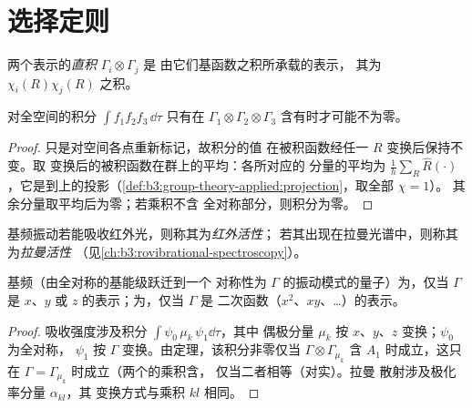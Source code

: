 \section{选择定则}

\begin{definition}[直积]\label{def:b3:group-theory-applied:direct-product}
两个表示的\emph{直积} $\Gamma_i\otimes\Gamma_j$ 是
由它们基函数之积所承载的表示，
其为 $\chi_i(R)\chi_j(R)$ 之积。
\end{definition}

\begin{theorem}[积分为零]\label{thm:b3:group-theory-applied:vanishing-integral}
对全空间的积分 $\int f_1f_2f_3\,\dd\tau$ 只有在
 $\Gamma_1\otimes\Gamma_2\otimes\Gamma_3$ 含有时才可能不为零。
\end{theorem}

\begin{proof}
只是对空间各点重新标记，故积分的值
在被积函数经任一 $R$ 变换后保持不变。取
变换后的被积函数在群上的平均：各所对应的
分量的平均为
$\frac1h\sum_R\hat R(\cdot)$，它是到上的投影（\cref{def:b3:group-theory-applied:projection}，取全部 $\chi = 1$）。
其余分量取平均后为零；若乘积不含
全对称部分，则积分为零。
\end{proof}

\begin{definition}\label{def:b3:group-theory-applied:activity}
基频振动若能吸收红外光，则称其为\emph{红外活性}；
若其出现在拉曼光谱中，则称其为\emph{拉曼活性}
（见\cref{ch:b3:rovibrational-spectroscopy}）。
\end{definition}

\begin{corollary}[红外与拉曼选择定则]\label{cor:b3:group-theory-applied:ir-raman}
基频（由全对称的基能级跃迁到一个
对称性为 $\Gamma$ 的振动模式的量子）为，仅当 $\Gamma$ 是
$x$、$y$ 或 $z$ 的表示；为，仅当 $\Gamma$ 是
二次函数（$x^2$、$xy$、\dots）的表示。
\end{corollary}

\begin{proof}
吸收强度涉及积分 $\int\psi_0\,\mu_k\,\psi_1\dd\tau$，其中
偶极分量 $\mu_k$ 按 $x$、$y$、$z$ 变换；$\psi_0$ 为全对称，
$\psi_1$ 按 $\Gamma$ 变换。由定理，该积分非零仅当
$\Gamma\otimes\Gamma_{\mu_k}$ 含 $A_1$ 时成立，这只在 $\Gamma =
\Gamma_{\mu_k}$ 时成立（两个的乘积含，
仅当二者相等（对实）。拉曼
散射涉及极化率分量 $\alpha_{kl}$，其
变换方式与乘积 $kl$ 相同。
\end{proof}

